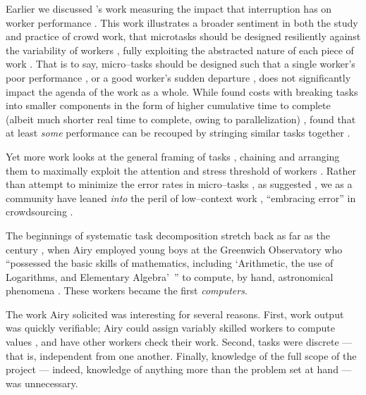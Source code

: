 \documentclass[trackingWork]{subfiles}
\begin{document}
Earlier we discussed \citeauthor{cheng2015break}'s work
measuring the impact that interruption has on worker performance
\cite{cheng2015break}.
This work illustrates a broader sentiment in
both the study and practice
of crowd work, that microtasks should be designed resiliently against the variability of workers%
, fully exploiting the abstracted nature of each piece of work
\cite{interruptionIqbal,delayAndOrderLasecki,vaish2014low}.
That is to say, micro--tasks should be designed such that a single worker's poor performance%
, or a good worker's sudden departure%
, does not significantly impact the agenda of the work as a whole.
While \citeauthor{cheng2015break} found costs with breaking tasks into smaller components
in the form of higher cumulative time to complete
(albeit much shorter real time to complete, owing to parallelization)%
, \citeauthor{delayAndOrderLasecki} found that at least \textit{some} performance can be recouped by stringing 
similar tasks together
\cite[respectively]{cheng2015break,delayAndOrderLasecki}.


Yet more work looks at the general framing of tasks%
, chaining and arranging them to maximally exploit
the attention and stress threshold %
of workers
\cite{Cai:2016:CRI:2858036.2858237}.
Rather than attempt to minimize the error rates in micro--tasks%
, as \citeauthor{Kinnaird:2012:WTM:2389176.2389219} suggested%
, we as a community have leaned \textit{into} the peril of
low--context work%
, ``embracing error'' in crowdsourcing
\cite{embracingErrorKrishna}.


\subsubsubsection{\pieceworkpers}
The beginnings of
systematic task decomposition
stretch back as far as the  century%
, when Airy employed young boys at the Greenwich Observatory who
``possessed the basic skills of mathematics, including
`Arithmetic, the use of Logarithms, and Elementary Algebra'~''
to compute, by hand, astronomical phenomena
\cite{grier2013computers}.
These workers became the first \textit{computers}.

The work Airy solicited was interesting for several reasons.
First, work output was quickly verifiable;
Airy could assign variably skilled workers to compute values%
, and have other workers check their work.
Second, tasks were discrete --- that is, independent from one another.
Finally, knowledge of the full scope of the project
--- indeed, knowledge of anything more than the problem set at hand ---
was unnecessary.
\end{document}
